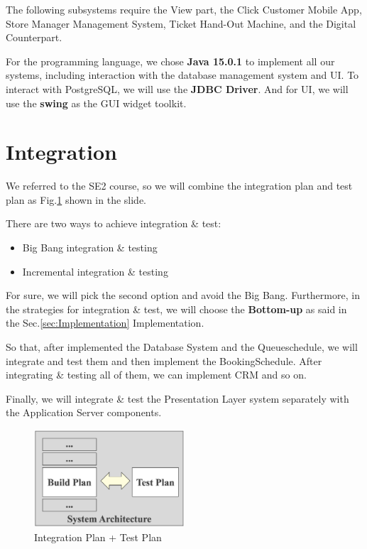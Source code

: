 \documentclass[a4paper,12pt]{report}
\begin{document}
The following subsystems require the View part, the Click Customer Mobile App, Store Manager Management System, Ticket Hand-Out Machine, and the Digital Counterpart.

For the programming language, we chose \textbf{Java 15.0.1} to implement all our systems, including interaction with the database management system and UI.
To interact with PostgreSQL, we will use the \textbf{JDBC Driver}.
And for UI, we will use the \textbf{swing} as the GUI widget toolkit.


\section{Integration}\label{sec:Integration}

We referred to the SE2 course, so we will combine the integration plan and test plan as Fig.\ref{fig:IntegrationAndTest} shown in the slide.\cite{SlidesSE2}

\vspace{3mm}

There are two ways to achieve integration \& test:
\begin{itemize}
	\item Big Bang integration \& testing
	\item Incremental integration \& testing
\end{itemize}

For sure, we will pick the second option and avoid the Big Bang.
Furthermore, in the strategies for integration \& test, we will choose the \textbf{Bottom-up} as said in the Sec.\ref{sec:Implementation} Implementation.

So that, after implemented the Database System and the Queueschedule, we will integrate and test them and then implement the BookingSchedule.
After integrating \& testing all of them, we can implement CRM and so on.

Finally, we will integrate \& test the Presentation Layer system separately with the Application Server components.

\begin{figure}[H]
	\includegraphics[width=0.5\textwidth]{IntegrationAndTest}
	\centering
	\caption{Integration Plan + Test Plan}
	\label{fig:IntegrationAndTest}
\end{figure}
\end{document}
